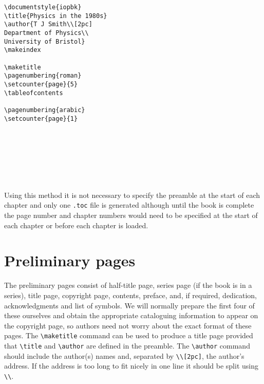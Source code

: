 \begin{verbatim}
\documentstyle{iopbk}
\title{Physics in the 1980s}
\author{T J Smith\\[2pc]
Department of Physics\\
University of Bristol}
\makeindex

\maketitle
\pagenumbering{roman}
\setcounter{page}{5}
\tableofcontents

\pagenumbering{arabic}
\setcounter{page}{1}








\end{verbatim}
Using this method it is not necessary to specify the preamble at 
the start of each chapter and only one \verb".toc" file is generated
although until the book is complete the page 
number and chapter numbers would need to be specified at the start of 
each chapter or before each chapter is loaded.




\chapter{Preliminary pages}
The preliminary pages 
consist of half-title page, series page (if the 
book is in a series), title page, 
copyright page, contents, preface, and, if required, 
dedication, 
acknowledgments and list of symbols. 
We will normally prepare the 
first four 
of these ourselves and obtain the appropriate cataloguing information to 
appear on the copyright page, so authors need not worry about the 
exact format of these pages. The \verb"\maketitle" command can be
used to produce a title page 
provided that \verb"\title" and
\verb"\author" 
are defined in the preamble. The \verb"\author" command should include the
author(s) names and, separated by \verb"\\[2pc]", the author's
address.
If the address is too long to fit nicely in one line it should be split
using \verb"\\".

